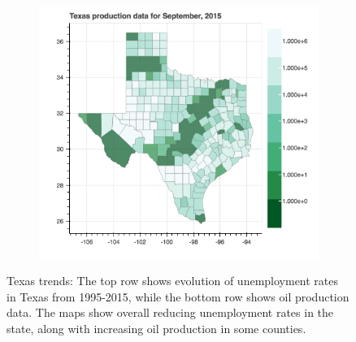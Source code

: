 \documentclass[11pt,letterpaper]{article}
\begin{document}
\begin{figure}
\begin{subfigure}{0.3\textwidth}
\includegraphics[width=1.2\linewidth]{tx_prod_2015}
\end{subfigure}
\caption{Texas trends: The top row shows evolution of unemployment rates in Texas from 1995-2015, while the bottom row shows oil production data. The maps show overall reducing unemployment rates in the state, along with increasing oil production in some counties.}
\label{fig:tx_maps}
\end{figure}
\end{document}
